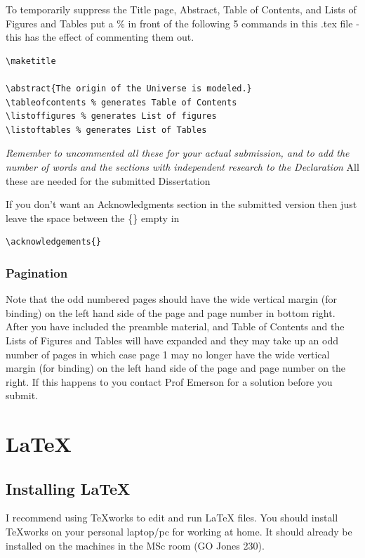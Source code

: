 \documentclass[twoside, fontsize=12pt,
     bibliography=totoc, %
     listof=totoc, %
     index=totoc, %
     onehalfspacing %
]{_MScDiss2017_cls}
\begin{document}
To temporarily suppress the Title page, Abstract, Table of Contents, and Lists of Figures and Tables put a \% in front of the following 5 commands in this .tex file - this has the effect of commenting them out. 
\begin{verbatim}
\maketitle

\abstract{The origin of the Universe is modeled.}
\tableofcontents % generates Table of Contents
\listoffigures % generates List of figures 
\listoftables % generates List of Tables
\end{verbatim}
 
 {\normalfont\itshape Remember to uncommented all these for your actual submission, and to add the number of words and the sections with independent research to the Declaration}  All these are needed for the submitted Dissertation

If you don't want an Acknowledgments section in the submitted version then just leave the space between the \{\} empty  in 
\begin{verbatim}\acknowledgements{}\end{verbatim}

\subsection{Pagination}
\label{subsec:sides}
Note that the odd numbered pages should have the wide vertical margin (for binding) on the left hand side of the page and page number in bottom right. After you have included the preamble material, and Table of Contents and the Lists of Figures and Tables will have expanded and they may take up an odd number of pages in which case page 1 may no longer have the wide vertical margin (for binding) on the left hand side of the page and page number on the right. If this happens to you contact Prof Emerson for a solution before you submit.

\chapter{\LaTeX }
\section{Installing \LaTeX}
I recommend using TeXworks to edit and run LaTeX files. You should install TeXworks on your personal laptop/pc for working at home. It should already be installed on the machines in the MSc room (GO Jones 230).
 
\end{document}
